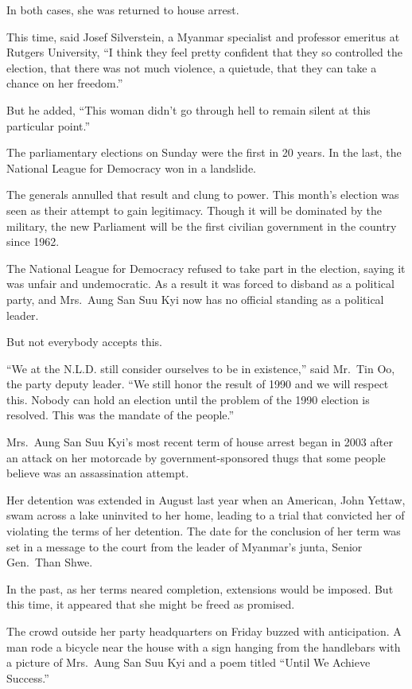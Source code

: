 ﻿\documentclass[12pt]{article}
\begin{document}
In both cases, she was returned to house arrest.

This time, said Josef Silverstein, a Myanmar specialist and professor emeritus at Rutgers
University, ``I think they feel pretty confident that they so controlled the election, that there
was not much violence, a quietude, that they can take a chance on her freedom.''

But he added, ``This woman didn't go through hell to remain silent at this particular point.''

The parliamentary elections on Sunday were the first in 20 years. In the last, the National League
for Democracy won in a landslide.

The generals annulled that result and clung to power. This month's election was seen as their
attempt to gain legitimacy. Though it will be dominated by the military, the new Parliament will be
the first civilian government in the country since 1962.

The National League for Democracy refused to take part in the election, saying it was unfair and
undemocratic. As a result it was forced to disband as a political party, and Mrs.~Aung San Suu Kyi
now has no official standing as a political leader.

But not everybody accepts this.

``We at the N.L.D. still consider ourselves to be in existence,'' said Mr.~Tin Oo, the party deputy
leader. ``We still honor the result of 1990 and we will respect this. Nobody can hold an election
until the problem of the 1990 election is resolved. This was the mandate of the people.''

Mrs.~Aung San Suu Kyi's most recent term of house arrest began in 2003 after an attack on her
motorcade by government-sponsored thugs that some people believe was an assassination attempt.

Her detention was extended in August last year when an American, John Yettaw, swam across a lake
uninvited to her home, leading to a trial that convicted her of violating the terms of her
detention. The date for the conclusion of her term was set in a message to the court from the leader
of Myanmar's junta, Senior Gen.~Than Shwe.

In the past, as her terms neared completion, extensions would be imposed. But this time, it appeared
that she might be freed as promised.

The crowd outside her party headquarters on Friday buzzed with anticipation. A man rode a bicycle
near the house with a sign hanging from the handlebars with a picture of Mrs.~Aung San Suu Kyi and a
poem titled ``Until We Achieve Success.''
\end{document}
